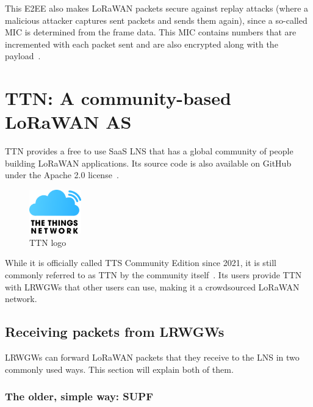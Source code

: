 This \ac{E2EE} also makes \ac{LoRaWAN} packets secure against replay attacks (where a malicious attacker captures sent packets and sends them again), since a so-called \ac{MIC} is determined from the frame data.
This \ac{MIC} contains numbers that are incremented with each packet sent and are also encrypted along with the payload~\cite[p. 22f.]{lora_alliance_inc_lorawan_specification_2017}.

\section{\acl{TTN}: A community-based \acs{LoRaWAN} \acl{AS}}

\ac{TTN} provides a free to use \ac{SaaS} \ac{LNS} that has a global community of people building \ac{LoRaWAN} applications.
Its source code is also available on GitHub under the Apache 2.0 license~\cite{the_things_network_thethingsnetworklorawan-stack_2023}.

\begin{figure}[htbp]
    \centering
    \includegraphics[width=0.2\textwidth]{pictures/logos/TTN-logo.eps}
    \caption[\acl{TTN} logo]{\acf{TTN} logo~\protect\cite{the_things_industries_bv_quick_nodate}}
\end{figure}


While it is officially called \acl{TTS Community Edition} since 2021, it is still commonly referred to as \acf{TTN} by the community itself~\cite{the_things_industries_bv_what_2022}.
Its users provide \ac{TTN} with \aclp{LRWGW} that other users can use, making it a crowdsourced \ac{LoRaWAN} network.

\subsection{Receiving packets from \aclp{LRWGW}}

\aclp{LRWGW} can forward \ac{LoRaWAN} packets that they receive to the \ac{LNS} in two commonly used ways.
This section will explain both of them.

\subsubsection{The older, simple way: \acl{SUPF}}

